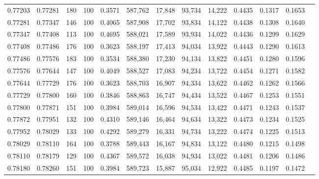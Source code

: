 \begin{tabular}{rrrrrrrrrrrrr}
0.77203 & 0.77281 &   180 & 100 &                                     0.3571 & 587,762 &  17,848 &  93,734 &  14,222 & 0.4435 & 0.1317 & 0.1653 \\
0.77281 & 0.77347 &   146 & 100 &                                     0.4065 & 587,908 &  17,702 &  93,834 &  14,122 & 0.4438 & 0.1308 & 0.1640 \\
0.77347 & 0.77408 &   113 & 100 &                                     0.4695 & 588,021 &  17,589 &  93,934 &  14,022 & 0.4436 & 0.1299 & 0.1629 \\
0.77408 & 0.77486 &   176 & 100 &                                     0.3623 & 588,197 &  17,413 &  94,034 &  13,922 & 0.4443 & 0.1290 & 0.1613 \\
0.77486 & 0.77576 &   183 & 100 &                                     0.3534 & 588,380 &  17,230 &  94,134 &  13,822 & 0.4451 & 0.1280 & 0.1596 \\
0.77576 & 0.77644 &   147 & 100 &                                     0.4049 & 588,527 &  17,083 &  94,234 &  13,722 & 0.4454 & 0.1271 & 0.1582 \\
0.77644 & 0.77729 &   176 & 100 &                                     0.3623 & 588,703 &  16,907 &  94,334 &  13,622 & 0.4462 & 0.1262 & 0.1566 \\
0.77729 & 0.77800 &   160 & 100 &                                     0.3846 & 588,863 &  16,747 &  94,434 &  13,522 & 0.4467 & 0.1253 & 0.1551 \\
0.77800 & 0.77871 &   151 & 100 &                                     0.3984 & 589,014 &  16,596 &  94,534 &  13,422 & 0.4471 & 0.1243 & 0.1537 \\
0.77872 & 0.77951 &   132 & 100 &                                     0.4310 & 589,146 &  16,464 &  94,634 &  13,322 & 0.4473 & 0.1234 & 0.1525 \\
0.77952 & 0.78029 &   133 & 100 &                                     0.4292 & 589,279 &  16,331 &  94,734 &  13,222 & 0.4474 & 0.1225 & 0.1513 \\
0.78029 & 0.78110 &   164 & 100 &                                     0.3788 & 589,443 &  16,167 &  94,834 &  13,122 & 0.4480 & 0.1215 & 0.1498 \\
0.78110 & 0.78179 &   129 & 100 &                                     0.4367 & 589,572 &  16,038 &  94,934 &  13,022 & 0.4481 & 0.1206 & 0.1486 \\
0.78180 & 0.78260 &   151 & 100 &                                     0.3984 & 589,723 &  15,887 &  95,034 &  12,922 & 0.4485 & 0.1197 & 0.1472 \\

\end{tabular}

